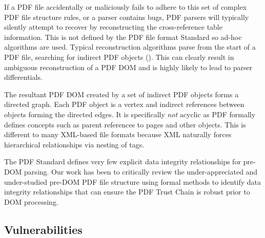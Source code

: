 If a PDF file accidentally or maliciously fails to adhere to this set of complex PDF file structure
rules, or a parser contains bugs, PDF parsers will typically silently attempt to recover
by reconstructing the cross-reference table information. 
This is not defined by the PDF file format Standard so 
ad-hoc algorithms are used. Typical reconstruction algorithms parse from the start of a PDF 
file, searching for indirect PDF objects (). This can clearly result
in ambiguous reconstruction of a PDF DOM and is highly likely to lead to parser differentials.

The resultant PDF DOM created by a set of indirect PDF objects forms a directed graph. 
Each PDF object is a vertex and indirect references between objects forming the directed edges. It is 
specifically \emph{not} acyclic as PDF formally defines concepts such as parent references to 
pages and other objects. This is different to many XML-based file formats because XML naturally forces hierarchical relationships via nesting of tags.

The PDF Standard defines very few explicit data integrity relationships for pre-DOM parsing. 
Our work has been to critically review the under-appreciated and under-studied pre-DOM PDF
file structure using formal methods to identify data integrity relationships that can 
ensure the PDF Trust Chain is robust prior to DOM processing.


\subsection{Vulnerabilities }
\label{sec:vulnerabilities}


